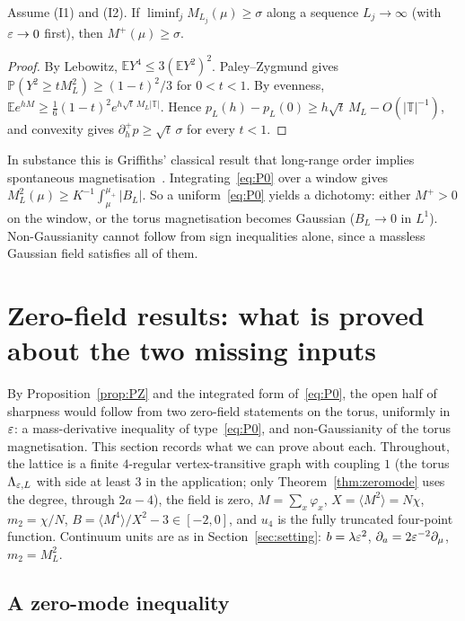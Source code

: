 \begin{proposition}\label{prop:PZ}
Assume (I1) and (I2). If $\liminf_jM_{L_j}(\mu)\ge\sigma$ along a sequence $L_j\to\infty$ (with $\varepsilon\to0$ first), then $M^+(\mu)\ge\sigma$.
\end{proposition}

\begin{proof}
By Lebowitz, $\mathbb EY^4\le3(\mathbb EY^2)^2$. Paley--Zygmund gives $\mathbb P(Y^2\ge tM_L^2)\ge(1-t)^2/3$ for $0<t<1$. By evenness, $\mathbb Ee^{hM}\ge\frac16(1-t)^2e^{h\sqrt t\,M_L|\mathbb T|}$. Hence $p_L(h)-p_L(0)\ge h\sqrt t\,M_L-O(|\mathbb T|^{-1})$, and convexity gives $\partial_h^+p\ge\sqrt t\,\sigma$ for every $t<1$.
\end{proof}

In substance this is Griffiths' classical result that long-range order implies spontaneous magnetisation~\cite{Gri66}. Integrating~\eqref{eq:P0} over a window gives $M_L^2(\mu)\ge K^{-1}\int_\mu^{\mu_+}|B_L|$. So a uniform~\eqref{eq:P0} yields a dichotomy: either $M^+>0$ on the window, or the torus magnetisation becomes Gaussian ($B_L\to0$ in $L^1$). Non-Gaussianity cannot follow from sign inequalities alone, since a massless Gaussian field satisfies all of them.

\section{Zero-field results: what is proved about the two missing inputs}\label{sec:zerofield}

By Proposition~\ref{prop:PZ} and the integrated form of~\eqref{eq:P0}, the open half of sharpness would follow from two zero-field statements on the torus, uniformly in $\varepsilon$: a mass-derivative inequality of type~\eqref{eq:P0}, and non-Gaussianity of the torus magnetisation. This section records what we can prove about each. Throughout, the lattice is a finite $4$-regular vertex-transitive graph with coupling $1$ (the torus $\Lambda_{\varepsilon,L}$ with side at least $3$ in the application; only Theorem~\ref{thm:zeromode} uses the degree, through $2a-4$), the field is zero, $M=\sum_x\varphi_x$, $X=\langle M^2\rangle=N\chi$, $m_2=\chi/N$, $B=\langle M^4\rangle/X^2-3\in[-2,0]$, and $u_4$ is the fully truncated four-point function. Continuum units are as in Section~\ref{sec:setting}: $b=\lambda\varepsilon^2$, $\partial_a=2\varepsilon^{-2}\partial_\mu$, $m_2=M_L^2$.

\subsection{A zero-mode inequality}

